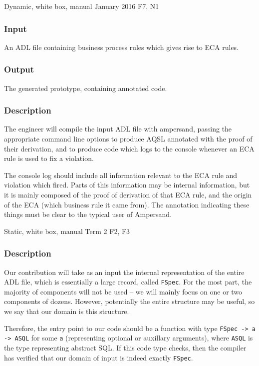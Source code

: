 \documentclass[12pt]{report}
\begin{document}
{Dynamic, white box, manual}
{January 2016}
{F7, N1}
\vspace{-12pt}\subsubsection*{Input}
An ADL file containing business process rules which gives rise to ECA rules. 

\vspace{-12pt}\subsubsection*{Output} 
The generated prototype, containing annotated code.

\vspace{-12pt}\subsubsection*{Description}
The engineer will compile the input ADL file with ampersand, passing the
appropriate command line options to produce AQSL annotated with the proof of
their derivation, and to produce code which logs to the console whenever an ECA
rule is used to fix a violation.

The console log should include all information relevant to the ECA rule and
violation which fired. Parts of this information may be internal information,
but it is mainly composed of the proof of derivation of that ECA rule, and the
origin of the ECA (which business rule it came from). The annotation indicating
these things must be clear to the typical user of Ampersand.

{Static, white box, manual}
{Term 2}
{F2, F3}
\vspace{-12pt}\subsubsection*{Description}
Our contribution will take as an input the internal representation of the entire
ADL file, which is essentially a large record, called \verb|FSpec|. For the most
part, the majority of components will not be used -- we will mainly focus on one
or two components of dozens. However, potentially the entire structure may be
useful, so we say that our domain is this structure.

Therefore, the entry point to our code should be a function with type
\verb|FSpec -> a -> ASQL| for some \verb|a| (representing optional or auxillary
arguments), where \verb|ASQL| is the type representing abstract SQL. If this
code type checks, then the compiler has verified that our domain of input is
indeed exactly \verb|FSpec|.
\end{document}
